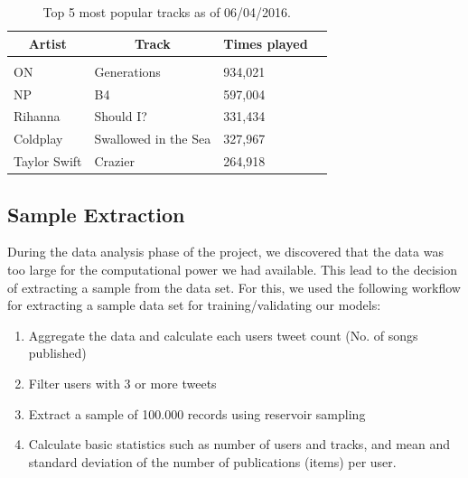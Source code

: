 \documentclass{article} %
\begin{document}
\begin{table}[!htbp]
\caption{Top 5 most popular tracks as of 06/04/2016.}
\label{table:3}
\begin{center}
\begin{tabular}{l l l l}
\multicolumn{1}{c}{\bf Artist} & \multicolumn{1}{c}{\bf Track} & \multicolumn{1}{c}{\bf Times played}
\\ \hline \\
ON              & Generations                & 934,021\\
NP              & B4                         & 597,004\\
Rihanna         & Should I?                  & 331,434\\
Coldplay        & Swallowed in the Sea       & 327,967\\
Taylor Swift    & Crazier                    & 264,918\\
\end{tabular}
\end{center}
\end{table}

\subsection{Sample Extraction}

During the data analysis phase of the project, we discovered that the data was too large for the computational power we had available. This lead to the decision of extracting a sample from the data set. For this, we used the following workflow for extracting a sample data set for training/validating our models:

\begin{enumerate}
    \item Aggregate the data and calculate each users tweet count (No. of songs published)
    \item Filter users with 3 or more tweets
    \item Extract a sample of 100.000 records using reservoir sampling
    \item Calculate basic statistics such as number of users and tracks, and mean and standard deviation of the number of publications (items) per user.
\end{enumerate}
\end{document}
